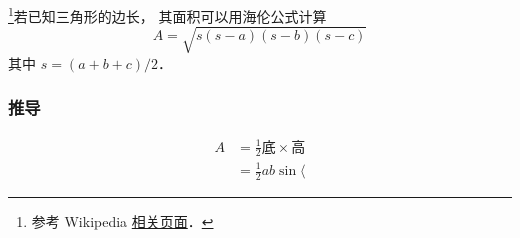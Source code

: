 
\footnote{参考 Wikipedia \href{https://en.wikipedia.org/wiki/Heron's_formula}{相关页面}．}若已知三角形的边长， 其面积可以用海伦公式计算
\begin{equation}
A = \sqrt{s(s-a)(s-b)(s-c)}
\end{equation}
其中 $s = (a+b+c)/2$．
\subsubsection{推导}
\begin{equation}
\begin{aligned}
A&=\frac{1}{2}\text{底}\times\text{高}\\
&=\frac{1}{2}ab\sin\langle
\end{aligned}
\end{equation}
